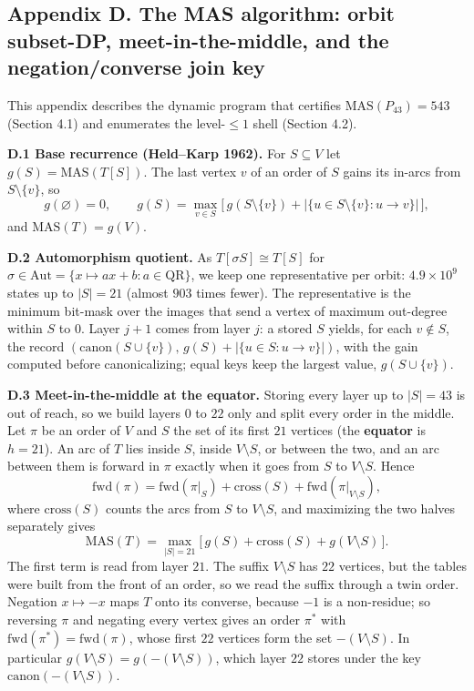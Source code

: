\documentclass[
]{article}
\begin{document}
\setcounter{table}{0}\setcounter{figure}{0}

\subsection{Appendix D. The MAS algorithm: orbit subset-DP,
meet-in-the-middle, and the negation/converse join
key}\label{appendix-d.-the-mas-algorithm-orbit-subset-dp-meet-in-the-middle-and-the-negationconverse-join-key}

This appendix describes the dynamic program that certifies
\(\mathrm{MAS}(P_{43}) = 543\) (Section 4.1) and enumerates the
level-\(\le 1\) shell (Section 4.2).

\textbf{D.1 Base recurrence (Held--Karp 1962).} For \(S \subseteq V\)
let \(g(S) = \mathrm{MAS}(T[S])\). The last vertex \(v\) of an order of
\(S\) gains its in-arcs from \(S \setminus \{v\}\), so
\[g(\varnothing) = 0, \qquad g(S) = \max_{v \in S}\bigl[\, g(S \setminus \{v\}) + |\{u \in S \setminus \{v\} : u \to v\}| \,\bigr],\]
and \(\mathrm{MAS}(T) = g(V)\).

\textbf{D.2 Automorphism quotient.} As \(T[\sigma S] \cong T[S]\) for
\(\sigma \in \mathrm{Aut} =
\{x \mapsto ax+b : a \in \mathrm{QR}\}\), we keep one representative per
orbit: \(4.9 \times 10^{9}\) states up to \(|S| = 21\) (almost \(903\)
times fewer). The representative is the minimum bit-mask over the images
that send a vertex of maximum out-degree within \(S\) to \(0\). Layer
\(j+1\) comes from layer \(j\): a stored \(S\) yields, for each
\(v \notin S\), the record
\((\mathrm{canon}(S \cup \{v\}),\, g(S) + |\{u \in S : u \to v\}|)\),
with the gain computed before canonicalizing; equal keys keep the
largest value, \(g(S \cup \{v\})\).

\textbf{D.3 Meet-in-the-middle at the equator.} Storing every layer up
to \(|S| = 43\) is out of reach, so we build layers \(0\) to \(22\) only
and split every order in the middle. Let \(\pi\) be an order of \(V\)
and \(S\) the set of its first \(21\) vertices (the \textbf{equator} is
\(h = 21\)). An arc of \(T\) lies inside \(S\), inside
\(V \setminus S\), or between the two, and an arc between them is
forward in \(\pi\) exactly when it goes from \(S\) to \(V \setminus S\).
Hence
\[\mathrm{fwd}(\pi) = \mathrm{fwd}(\pi|_S) + \mathrm{cross}(S) + \mathrm{fwd}(\pi|_{V \setminus S}),\]
where \(\mathrm{cross}(S)\) counts the arcs from \(S\) to
\(V \setminus S\), and maximizing the two halves separately gives
\[\mathrm{MAS}(T) = \max_{|S| = 21} \bigl[\, g(S) + \mathrm{cross}(S) + g(V \setminus S) \,\bigr].\]
The first term is read from layer \(21\). The suffix \(V \setminus S\)
has \(22\) vertices, but the tables were built from the front of an
order, so we read the suffix through a twin order. Negation
\(x \mapsto -x\) maps \(T\) onto its converse, because \(-1\) is a
non-residue; so reversing \(\pi\) and negating every vertex gives an
order \(\pi^{*}\) with \(\mathrm{fwd}(\pi^{*}) = \mathrm{fwd}(\pi)\),
whose first \(22\) vertices form the set \(-(V \setminus S)\). In
particular \(g(V \setminus S) = g(-(V \setminus S))\), which layer
\(22\) stores under the key \(\mathrm{canon}(-(V \setminus S))\).
\end{document}
